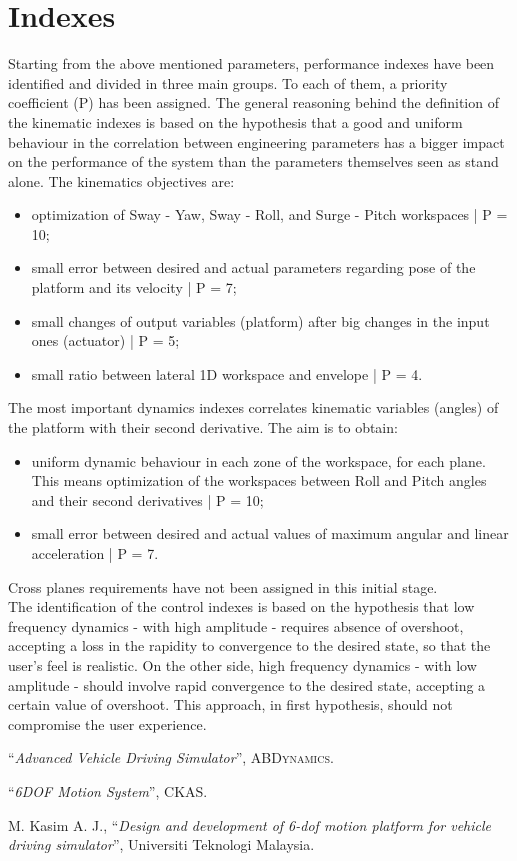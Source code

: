 \documentclass[10.5pt, twocolumn]{article}
\newcommand{\Virgolette}[1]{``#1''}
\begin{document}
\section{Indexes}
Starting from the above mentioned parameters, performance indexes have been identified and divided in three main groups. To each of them, a priority coefficient (P) has been assigned. The general reasoning behind the definition of the kinematic indexes is based on the hypothesis that a good and uniform behaviour in the correlation between engineering parameters has a bigger impact on the performance of the system than the parameters themselves seen as stand alone. The kinematics objectives are:
\begin{itemize}
	\item optimization of Sway - Yaw, Sway - Roll, and Surge - Pitch workspaces | P = 10;
	\item small error between desired and actual parameters regarding pose of the platform and its velocity | P = 7;
	\item small changes of output variables (platform) after big changes in the input ones (actuator) | P = 5;
	\item small ratio between lateral 1D workspace and envelope | P = 4.
\end{itemize}
The most important dynamics indexes correlates kinematic variables (angles) of the platform with their second derivative. The aim is to obtain:
\begin{itemize}
	\item uniform dynamic behaviour in each zone of the workspace, for each plane. This means optimization of the workspaces between Roll and Pitch angles and their second derivatives | P = 10;
	\item small error between desired and actual values of maximum angular and linear acceleration | P = 7.
\end{itemize}
Cross planes requirements have not been assigned in this initial stage.
\\ The identification of the control indexes is based on the hypothesis that low frequency dynamics - with high amplitude - requires absence of overshoot, accepting a loss in the rapidity to convergence to the desired state, so that the user's feel is realistic. On the other side, high frequency dynamics - with low amplitude - should involve rapid convergence to the desired state, accepting a certain value of overshoot. This approach, in first hypothesis, should not compromise the user experience.

\begin{thebibliography}{}
\Virgolette{\textit{Advanced Vehicle Driving Simulator}}, \textsc{ABDynamics}.

\Virgolette{\textit{6DOF Motion System}}, \textsc{CKAS}.

M. Kasim A. J., \Virgolette{\textit{Design and development of 6-dof motion platform for vehicle driving simulator}}, Universiti Teknologi Malaysia.
\end{thebibliography}
\end{document}
